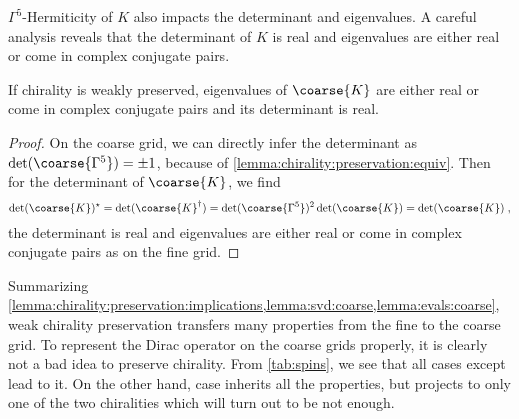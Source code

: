 $\Gamma^{5}$-Hermiticity of $K$ also impacts the determinant and eigenvalues.
A careful analysis reveals that the determinant of $K$ is real and eigenvalues are either real or come in complex conjugate pairs.


\begin{lemma} \label{lemma:evals:coarse}
If chirality is weakly preserved, eigenvalues of $\coarse{K}$ are either real or come in complex conjugate pairs and its determinant is real.
\end{lemma}

\begin{proof}
On the coarse grid, we can directly infer the determinant as $\det(\coarse{\Gamma^{5}}) = \pm 1$, because of \cref{lemma:chirality:preservation:equiv}.
Then for the determinant of $\coarse{K}$, we find
\begin{equation}
\det(\coarse{K})^{\star} =
\det(\coarse{K}^{\dagger}) =
\det(\coarse{\Gamma^{5}})^{2} \det(\coarse{K}) =
\det(\coarse{K}) \;,
\end{equation}
\ie the determinant is real and eigenvalues are either real or come in complex conjugate pairs as on the fine grid.
\end{proof}


Summarizing \cref{lemma:chirality:preservation:implications,lemma:svd:coarse,lemma:evals:coarse}, weak chirality preservation transfers many properties from the fine to the coarse grid.
To represent the Dirac operator on the coarse grids properly, it is clearly not a bad idea to preserve chirality.
From \cref{tab:spins}, we see that all cases except  lead to it.
On the other hand, case  inherits all the properties, but projects to only one of the two chiralities which will turn out to be not enough.



